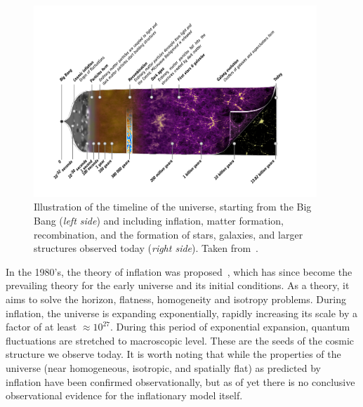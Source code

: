 \begin{figure}[ht]
	\centering
	\includegraphics[width=0.95\textwidth]{fig/history_universe_inverted.png}
	\caption{Illustration of the timeline of the universe, starting from the Big Bang (\emph{left side}) and including inflation, matter formation, recombination, and the formation of stars, galaxies, and larger structures observed today (\emph{right side}). Taken from~\cite{ESA:2013tl}.}
	\label{fig:timelineuniverse}
\end{figure}
In the 1980's, the theory of inflation was proposed~\cite{Guth:1980zm,Linde:1981mu,Albrecht:1982wi}, which has since become the prevailing theory for the early universe and its initial conditions. As a theory, it aims to solve the horizon, flatness, homogeneity and isotropy problems. During inflation, the universe is expanding exponentially, rapidly increasing its scale by a factor of at least $\approx 10^{27}$. During this period of exponential expansion, quantum fluctuations are stretched to macroscopic level. These are the seeds of the cosmic structure we observe today. It is worth noting that while the properties of the universe (near homogeneous, isotropic, and spatially flat) as predicted by inflation have been confirmed observationally, but as of yet there is no conclusive observational evidence for the inflationary model itself. 

